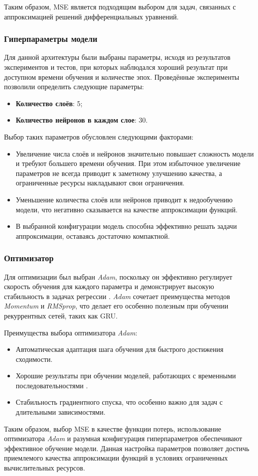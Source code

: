 Таким образом, MSE является подходящим выбором для задач, связанных с аппроксимацией решений дифференциальных уравнений.

\subsubsection{Гиперпараметры модели}

Для данной архитектуры были выбраны параметры, исходя из результатов экспериментов и тестов, при которых наблюдался хороший результат при доступном времени обучения и количестве эпох. Проведённые эксперименты позволили определить следующие параметры:
\begin{itemize}
    \item \textbf{Количество слоёв}: 5;
    \item \textbf{Количество нейронов в каждом слое}: 30.
\end{itemize}

Выбор таких параметров обусловлен следующими факторами:
\begin{itemize}
    \item Увеличение числа слоёв и нейронов значительно повышает сложность модели и требуют большего времени обучения. При этом избыточное увеличение параметров не всегда приводит к заметному улучшению качества, а ограниченные ресурсы накладывают свои ограничения.
    \item Уменьшение количества слоёв или нейронов приводит к недообучению модели, что негативно сказывается на качестве аппроксимации функций.
    \item В выбранной конфигурации модель способна эффективно решать задачи аппроксимации, оставаясь достаточно компактной.
\end{itemize}

\subsubsection{Оптимизатор}

Для оптимизации был выбран \textit{Adam}, поскольку он эффективно регулирует скорость обучения для каждого параметра и демонстрирует высокую стабильность в задачах регрессии \cite{HOML}. \textit{Adam} сочетает преимущества методов \textit{Momentum} и \textit{RMSprop}, что делает его особенно полезным при обучении рекуррентных сетей, таких как GRU.

Преимущества выбора оптимизатора \textit{Adam}:
\begin{itemize}
    \item Автоматическая адаптация шага обучения для быстрого достижения сходимости.
    \item Хорошие результаты при обучении моделей, работающих с временными последовательностями \cite{adam}.
    \item Стабильность градиентного спуска, что особенно важно для задач с длительными зависимостями.
\end{itemize}

Таким образом, выбор MSE в качестве функции потерь, использование оптимизатора \textit{Adam} и разумная конфигурация гиперпараметров обеспечивают эффективное обучение модели. Данная настройка параметров позволяет достичь приемлемого качества аппроксимации функций в условиях ограниченных вычислительных ресурсов.
